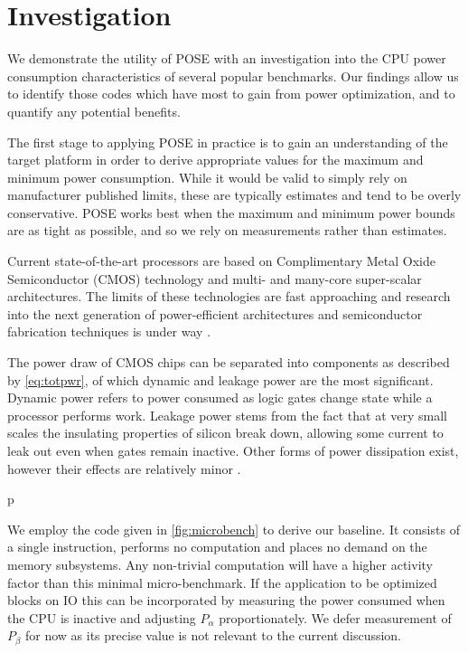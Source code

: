 \section{Investigation}
\label{sec:investigation}


We demonstrate the utility of POSE with an investigation into the CPU power consumption characteristics of several popular benchmarks.
Our findings allow us to identify those codes which have most to gain from power optimization, and to quantify any potential benefits.

The first stage to applying POSE in practice is to gain an understanding of the target platform in order to derive appropriate values for the maximum and minimum power consumption.
While it would be valid to simply rely on manufacturer published limits, these are typically estimates and tend to be overly conservative.
POSE works best when the maximum and minimum power bounds are as tight as possible, and so we rely on measurements rather than estimates.

Current state-of-the-art processors are based on Complimentary Metal Oxide Semiconductor (CMOS) technology and multi- and many-core super-scalar architectures.
The limits of these technologies are fast approaching and research into the next generation of power-efficient architectures and semiconductor fabrication techniques is under way \cite{esmaeilzadeh:2011aa}.

The power draw of CMOS chips can be separated into components as described by \autoref{eq:totpwr}, of which dynamic and leakage power are the most significant.
Dynamic power refers to power consumed as logic gates change state while a processor performs work. 
Leakage power stems from the fact that at very small scales the insulating properties of silicon break down, allowing some current to leak out even when gates remain inactive.
Other forms of power dissipation exist, however their effects are relatively minor \cite{kaxiras:2008aa}.



p

We employ the code given in \autoref{fig:microbench} to derive our baseline.  It consists of a single instruction, performs no computation and places no demand on the memory subsystems. Any non-trivial computation will have a higher activity factor than this minimal micro-benchmark. If the application to be optimized blocks on IO this can be incorporated by measuring the power consumed when the CPU is inactive and adjusting $P_\alpha$ proportionately. We defer measurement of $P_{\beta}$ for now as its precise value is not relevant to the current discussion. 


